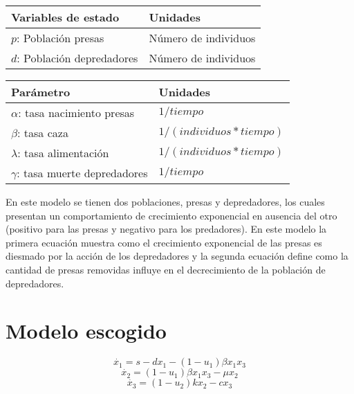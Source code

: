 \documentclass{article}
\begin{document}
        \begin{tabular}[t]{|p{4cm} p{3.5cm}|}
            \hline
            \textbf{Variables de estado} & \textbf{Unidades} \\
            \hline
            $p$: Población presas       & Número de individuos\\
            $d$: Población depredadores & Número de individuos\\
            \hline
        \end{tabular}
        \hspace{0.5cm}
        \begin{tabular}[t]{|p{4.5cm} p{4cm}|}
            \hline
            \textbf{Parámetro} & \textbf{Unidades} \\
            \hline
            $\alpha$:  tasa nacimiento presas   & $1/tiempo$\\
            $\beta$:   tasa caza                & $1/(individuos * tiempo)$\\
            $\lambda$: tasa alimentación        & $1/(individuos * tiempo)$\\
            $\gamma$:  tasa muerte depredadores & $1/tiempo$\\
            \hline
        \end{tabular}
        \cite{predator}

        \vspace{0.5cm}

        En este modelo se tienen dos poblaciones, presas y depredadores, los
        cuales presentan un comportamiento de crecimiento exponencial en
        ausencia del otro (positivo para las presas y negativo para los
        predadores). En este modelo la primera ecuación muestra como el
        crecimiento exponencial de las presas es diesmado por la acción de los
        depredadores y la segunda ecuación define como la cantidad de presas
        removidas influye en el decrecimiento de la población de depredadores.

\newpage

\section{Modelo escogido}

    \Large
    $$\dot{x_1} = s -dx_1 - (1-u_1) \beta x_1 x_3$$
    $$\dot{x_2} = (1-u_1) \beta x_1 x_3 - \mu x_2$$
    $$\dot{x_3} = (1-u_2) k x_2 - c x_3$$
    \normalsize

\vspace{1cm}
\end{document}
